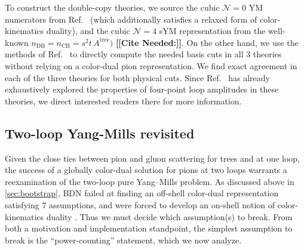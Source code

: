 \documentclass[11pt,letter]{article}
\newcommand{\citepls}[1]{{\bf\color{red}[[Cite Needed:#1]]}}
\newcommand{\atree}{\ensuremath{A^{\text{tree}}}}
\begin{document}
To construct the double-copy theories, we source the cubic
$\mathcal{N}=0$ YM numerators from Ref.~\cite{Bern:2015ooa} (which
additionally satisfies a relaxed form of color-kinematics duality),
and the cubic $\mathcal{N}=4$ sYM representation from the well-known
$n_{\text{DB}} = n_{\text{CB}} = s^2t\, \atree)$ \citepls{}.
On the other hand, we use the methods of Ref.~\cite{Carrasco:2023qgz}
to directly compute the needed basis cuts in all 3 theories without
relying on a color-dual pion representation.  We find exact agreement
in each of the three theories for both physical cuts.  Since
Ref.~\cite{Carrasco:2023qgz} has already exhaustively explored the
properties of four-point loop amplitudes in these theories, we direct
interested readers there for more information.



\subsection{Two-loop Yang-Mills revisited}
Given the close ties between pion and gluon scattering for trees and
at one loop, the success of a globally color-dual solution for pions
at two loops warrants a reexamination of the two-loop pure Yang--Mills
problem.  As discussed above in \cref{sec:bootstrap}, BDN failed at
finding an off-shell color-dual representation satisfying 7
assumptions, and were forced to develop an on-shell notion of
color-kinematics duality \cite{Bern:2015ooa}.  Thus we must decide
which assumption(s) to break.  From both a motivation and
implementation standpoint, the simplest assumption to break is the
``power-counting'' statement, which we now analyze.
\end{document}
